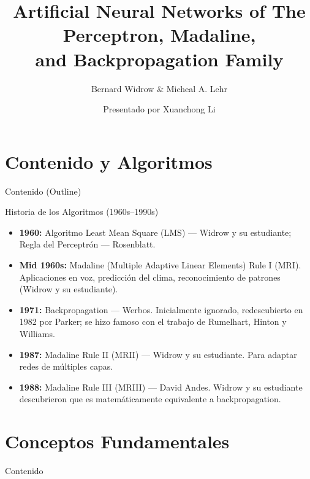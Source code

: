 \documentclass[aspectratio=169,utf8,spanish]{beamer}
\title[ANN: Perceptron, Madaline, Backpropagation]{
  Artificial Neural Networks of The Perceptron, Madaline,\\
  and Backpropagation Family
}
\subtitle{Bernard Widrow \& Micheal A. Lehr}
\author{Presentado por Xuanchong Li}
\institute{Stanford}
\date{}
\begin{document}
\begin{frame}
  \titlepage
\end{frame}

\section{Contenido y Algoritmos}

\begin{frame}{Contenido (Outline)}
  \tableofcontents[hideallsubsections]
\end{frame}

\begin{frame}{Historia de los Algoritmos (1960s--1990s)}
  \begin{itemize}
    \item \textbf{1960:} Algoritmo Least Mean Square (LMS) — Widrow y su estudiante; Regla del Perceptrón — Rosenblatt.
    \item \textbf{Mid 1960s:} Madaline (Multiple Adaptive Linear Elements) Rule I (MRI). Aplicaciones en voz, predicción del clima, reconocimiento de patrones (Widrow y su estudiante).
    \item \textbf{1971:} Backpropagation — Werbos. Inicialmente ignorado, redescubierto en 1982 por Parker; se hizo famoso con el trabajo de Rumelhart, Hinton y Williams.
    \item \textbf{1987:} Madaline Rule II (MRII) — Widrow y su estudiante. Para adaptar redes de múltiples capas.
    \item \textbf{1988:} Madaline Rule III (MRIII) — David Andes. Widrow y su estudiante descubrieron que es matemáticamente equivalente a backpropagation.
  \end{itemize}
\end{frame}

\section{Conceptos Fundamentales}

\begin{frame}{Contenido}
\end{frame}
\end{document}
